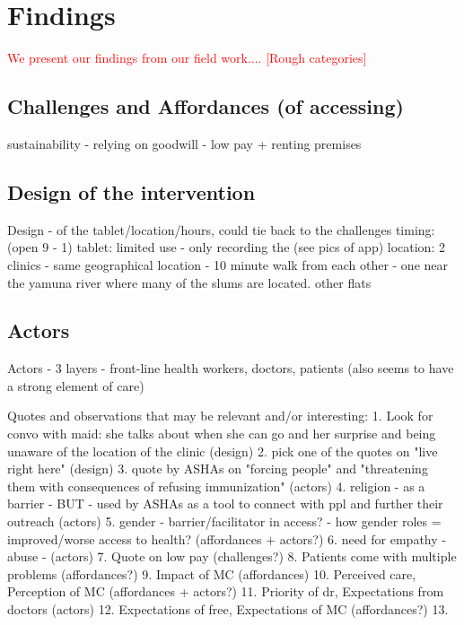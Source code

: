 \section{Findings}
\begin{comment}
This will form the chunk of your writing. I have sometimes iterated through these in written form, or else made a rough outline  on paper and then put it down. It is best that we talk about this section before you attempt to write. Depending on the structure of this section, you might label the section Findings or Analysis. The thing to remember is that all of your data goes into this section, and you need to weave a story around your data that is compelling, novel, and forms the central theme of the paper. If you have done qualitative work, make sure you include these quotes in the findings. Most importantly, do not tell a story based on quotes you have. Pick quotes based on the story you want to tell.

STORY OF USE
\end{comment}
\textcolor{red}{We present our findings from our field work.... [Rough categories]}

\subsection{Challenges and Affordances (of accessing)}
sustainability - relying on goodwill - low pay + renting premises

\subsection{Design of the intervention}
Design - of the tablet/location/hours, could tie back to the challenges
timing: (open 9 - 1)
tablet: limited use - only recording the  (see pics of app)
location: 2 clinics - same geographical location - 10 minute walk from each other - one near the yamuna river where many of the slums are located. other flats

\subsection{Actors}
Actors - 3 layers - front-line health workers, doctors, patients (also seems to have a strong element of care)

Quotes and observations that may be relevant and/or interesting:
1. Look for convo with maid: she talks about when she can go and her surprise and being unaware of the location of the clinic (design)
2. pick one of the quotes on "live right here" (design)
3. quote by ASHAs on "forcing people" and "threatening them with consequences of refusing immunization" (actors)
4. religion - as a barrier - BUT - used by ASHAs as a tool to connect with ppl and further their outreach (actors)
5. gender - barrier/facilitator in access? - how gender roles = improved/worse access to health? (affordances + actors?)
6. need for empathy - abuse - (actors) 
7. Quote on low pay (challenges?)
8. Patients come with multiple problems (affordances?)
9. Impact of MC (affordances)
10. Perceived care, Perception of MC (affordances + actors?)
11. Priority of dr, Expectations from doctors (actors)
12. Expectations of free, Expectations of MC (affordances?)
13. 


